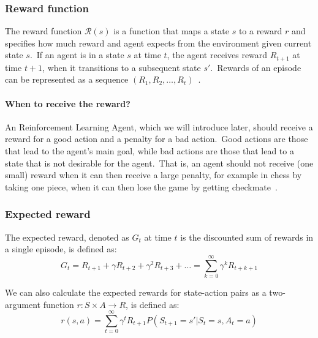 \documentclass[../xlapes02]{subfiles}
\begin{document}
    \subsubsection{Reward function}\label{subsubsec:reward-function-rl}
    The reward function $\mathcal{R}(s)$ is a function that maps a state $s$ to a reward $r$ and specifies how much reward and agent expects from the environment given current state $s$.\ If an agent is in a state $s$ at time $t$, the agent receives reward  $R_{t+1}$  at time $t + 1$,  when it transitions to a subsequent state $s'$.\ Rewards of an episode can be represented as a sequence $(R_1, R_2, \ldots, R_t)$~\cite{FITMT25127}.

    \paragraph{When to receive the reward?} An Reinforcement Learning Agent, which we will introduce later, should receive a reward for a good action and a penalty for a bad action.\ Good actions are those that lead to the agent's main goal, while bad actions are those that lead to a state that is not desirable for the agent.\ That is, an agent should not receive (one small) reward when it can then receive a large penalty, for example in chess by taking one piece, when it can then lose the game by getting checkmate~\cite{sutton2018reinforcement}.

    \subsubsection{Expected reward}\label{subsubsec:expected-reward}
    The expected reward, denoted as $G_t$ at time $t$ is the discounted sum of rewards in a single episode, is defined as:
    \begin{equation}
        \label{eq:expected-reward}
        G_t=R_{t+1}+\gamma R_{t+2}+\gamma^2 R_{t+3}+\ldots=\sum_{k=0}^{\infty}\gamma^k R_{t+k+1}
    \end{equation}

    We can also calculate the expected rewards for state-action pairs as a two-argument function $r:S\times A\to R$, is defined as:
    \begin{equation}
        \label{eq:expected-reward-state-action}
        r(s,a)=\sum_{t=0}^{\infty}\gamma^t R_{t+1} P(S_{t+1}=s'|S_t=s,A_t=a)
    \end{equation}
\end{document}
